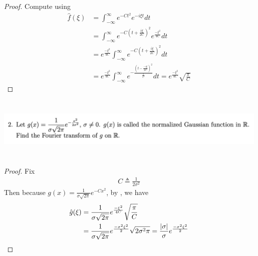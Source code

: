 \documentclass{report}
\begin{document}
\begin{proof}
Compute using 
\begin{align*}
\hat{f}(\xi)&=\int_{-\infty}^{\infty}e^{-Ct^2}e^{-i\xi t}dt\\
&=\int_{-\infty}^{\infty}e^{-C(t+\frac{i\xi}{2C})^2}e^{\frac{-\xi^2}{4C}}dt\\
&=e^{\frac{-\xi^2}{4C}}\int_{-\infty}^{\infty} e^{-C(t+\frac{i\xi}{2C})^2}dt\\
&=e^{\frac{-\xi^2}{4C}}\int_{-\infty}^{\infty} e^{-\frac{(t-\frac{-i\xi}{2C})^2}{\frac{1}{C}}}dt=e^{\frac{-\xi^2}{4C}} \sqrt{\frac{\pi}{C}} 
\end{align*}
\end{proof}
\begin{question}{}{}
\includegraphics[height=3cm,width=18cm]{hw3q2}
\end{question}
\begin{proof}
Fix 
\begin{align*}
C\triangleq \frac{1}{2\sigma^2}
\end{align*}
Then because $g(x)=\frac{1}{\sigma \sqrt{2\pi} }e^{-Cx^2}$, by , we have 
\begin{align*}
\hat{g}(\xi)&=\frac{1}{\sigma \sqrt{2\pi} }e^{\frac{-\xi^2}{4C}}\sqrt{\frac{\pi}{C}} \\
&= \frac{1}{\sigma\sqrt{2\pi} }e^{\frac{-\sigma^2 \xi^2}{2}}\sqrt{2\sigma^2 \pi}= \frac{\left|\sigma\right|}{\sigma}e^{\frac{-\sigma^2 \xi^2}{2}}
\end{align*}
\end{proof}
\end{document}
